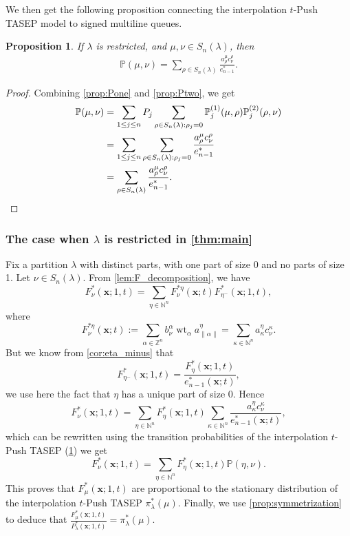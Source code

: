 \documentclass[12pt]{amsart}
\newtheorem{prop}[thm]{Proposition}
\theoremstyle{definition}
\newcommand{\bfx}{\boldsymbol{x}}
\DeclareMathOperator{\wt}{wt}
\newcommand{\ZZ}{\mathbb Z}
\newcommand{\NN}{\mathbb N}
\newcommand{\PP}{\mathbb P}
\newcommand{\PPone}[1]{\mathbb P^{(1)}_{#1}}
\newcommand{\PPtwo}[1]{\mathbb P^{(2)}_{#1}}
\begin{document}
We then get the following proposition connecting the interpolation $t$-Push TASEP model to signed multiline queues.
\begin{prop}\label{prop:intTASEP_SMLQ}
If $\lambda$ is restricted, and $\mu,\nu\in S_n(\lambda)$, then    
\begin{align*}
    \PP(\mu,\nu)=\sum_{\rho\in S_n(\lambda)}  \frac{a^\mu_\rho c^\rho_{\nu}}{e^*_{n-1}}.
\end{align*}
\end{prop}
\begin{proof}
    Combining \cref{prop:Pone} and \cref{prop:Ptwo}, we get
    \begin{align*}
    \PP(\mu,\nu)
    &=\sum_{1\leq j\leq n}P_j\sum_{\rho\in S_n(\lambda):\rho_j=0}\PPone{j}(\mu,\rho)\PPtwo{j}(\rho,\nu)\\
    &=\sum_{1\leq j\leq n}\sum_{\rho\in S_n(\lambda):\rho_j=0}  \frac{a^\mu_\rho c^\rho_{\nu}}{e^*_{n-1}}\\
    &=\sum_{\rho\in S_n(\lambda)}  \frac{a^\mu_\rho c^\rho_{\nu}}{e^*_{n-1}}.\qedhere
\end{align*}
\end{proof}

\subsubsection{The case when \texorpdfstring{$\lambda$}{lambda} is restricted in \cref{thm:main}}
Fix a partition $\lambda$ with distinct parts, with one part of size 0 and no parts of size 1. 
Let $\nu\in S_n(\lambda)$.
From \cref{lem:F_decomposition}, we have
 \begin{equation*}
   F^*_\nu(\bfx;1,t)=\sum_{\eta\in\NN^n}{F^{*\eta}_\nu}(\bfx;t) F^*_{\eta^{-}}(\bfx;1,t), 
 \end{equation*}
 where 
 $$F^{*\eta}_{\nu}(\bfx;t) :=\sum_{\alpha\in\ZZ^n}b_\nu^\alpha \wt_\alpha a^\eta_{\lVert \alpha\rVert}=\sum_{\kappa\in \NN^n}a_\kappa^\eta c^\kappa_\nu .$$
But we know from \cref{cor:eta_minus} that
$$F^*_{\eta^-}(\bfx;1,t)=\frac{F^*_{\eta}(\bfx;1,t)}{e_{n-1}^*(\bfx;t)},$$
we use here the fact that $\eta$ has a unique part of size 0. Hence
\begin{equation*}
   F^*_\nu(\bfx;1,t)=\sum_{\eta\in\NN^n}F^*_{\eta}(\bfx;1,t)\sum_{\kappa\in \NN^n}\frac{a_\kappa^\eta c^\kappa_\nu}{e_{n-1}^*(\bfx;t)},
 \end{equation*}
which can be rewritten using the transition probabilities of the interpolation $t$-Push TASEP (\cref{prop:intTASEP_SMLQ}) we get
\begin{equation*}
   F^*_\nu(\bfx;1,t)=\sum_{\eta\in\NN^n}F^*_{\eta}(\bfx;1,t)\PP(\eta,\nu).
 \end{equation*}
This proves that $F^*_\mu(\bfx;1,t)$ are proportional to the stationary distribution of the interpolation $t$-Push TASEP $\pi^*_\lambda(\mu)$.
Finally, we use \cref{prop:symmetrization} to deduce that $\frac{F^*_\mu(\bfx;1,t)}{P^*_\lambda(\bfx;1,t)}=\pi^*_\lambda(\mu).$
\end{document}

